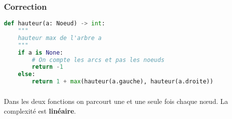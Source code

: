 \documentclass[svgnames,11pt]{beamer}
\begin{document}
\begin{frame}[fragile]
    \frametitle{Correction}

\begin{center}
\begin{lstlisting}[language=Python , basicstyle=\ttfamily\small, xleftmargin=.2em, xrightmargin=-4em]
def hauteur(a: Noeud) -> int:
    """
    hauteur max de l'arbre a
    """
    if a is None:
        # On compte les arcs et pas les noeuds
        return -1
    else:
        return 1 + max(hauteur(a.gauche), hauteur(a.droite))
\end{lstlisting}
\label{CODE}
\end{center}   

\end{frame}
\begin{frame}
    \frametitle{}

    Dans les deux fonctions on parcourt une et une seule fois chaque nœud. La complexité est \textbf{linéaire}.

\end{frame}
\end{document}
